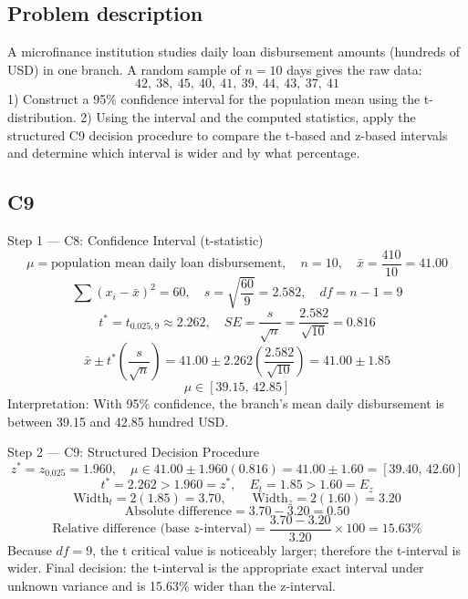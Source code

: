 

	\begin{ExamProblems}
		\item
		\subsection*{Problem description}
		A microfinance institution studies daily loan disbursement amounts (hundreds of USD) in one branch.
		A random sample of $n=10$ days gives the raw data:
		\[
		42,\ 38,\ 45,\ 40,\ 41,\ 39,\ 44,\ 43,\ 37,\ 41
		\]
		1) Construct a 95\% confidence interval for the population mean using the t-distribution.
		2) Using the interval and the computed statistics, apply the structured C9 decision procedure to compare the t-based and z-based intervals and determine which interval is wider and by what percentage.

		\subsection*{C9}
		Step 1 --- C8: Confidence Interval (t-statistic)
		\[
		\mu=\text{population mean daily loan disbursement},\quad n=10,\quad \bar{x}=\frac{410}{10}=41.00
		\]
		\[
		\sum (x_i-\bar{x})^2=60,\quad s=\sqrt{\frac{60}{9}}=2.582,\quad df=n-1=9
		\]
		\[
		t^*=t_{0.025,9}\approx 2.262,\quad SE=\frac{s}{\sqrt{n}}=\frac{2.582}{\sqrt{10}}=0.816
		\]
		\[
		\bar{x}\pm t^*\left(\frac{s}{\sqrt{n}}\right)=41.00\pm 2.262\left(\frac{2.582}{\sqrt{10}}\right)=41.00\pm 1.85
		\]
		\[
		\mu\in[39.15,\,42.85]
		\]
		Interpretation: With 95\% confidence, the branch's mean daily disbursement is between 39.15 and 42.85 hundred USD.

		Step 2 --- C9: Structured Decision Procedure
		\[
		z^*=z_{0.025}=1.960,\quad \mu\in 41.00\pm 1.960(0.816)=41.00\pm 1.60=[39.40,\,42.60]
		\]
		\[
		t^*=2.262>1.960=z^*,\quad E_t=1.85>1.60=E_z
		\]
		\[
		\text{Width}_t=2(1.85)=3.70,\qquad \text{Width}_z=2(1.60)=3.20
		\]
		\[
		\text{Absolute difference}=3.70-3.20=0.50
		\]
		\[
		\text{Relative difference (base }z\text{-interval)}=\frac{3.70-3.20}{3.20}\times 100=15.63\%
		\]
		Because $df=9$, the t critical value is noticeably larger; therefore the t-interval is wider.
		Final decision: the t-interval is the appropriate exact interval under unknown variance and is 15.63\% wider than the z-interval.

		\newpage
		\item

\end{ExamProblems}
